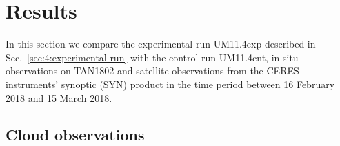 \begin{table}
\caption[Diagnostic model levels and layers]{
Diagnostic model levels and layers relevant to shallow boundary layer convection, turbulence
and cloud, listed from the lowest to the highest.
}
\label{tab:4:levels}
\centering
\centerline{}
\end{table}


\section{Results}
\label{sec:4:results}

In this section we compare the experimental run UM11.4exp described in Sec.~\ref{sec:4:experimental-run} with the control run UM11.4cnt, in-situ observations on TAN1802 and satellite observations from the CERES instruments' synoptic (SYN) product \citep{loeb2018} in the time period between 16 February 2018 and 15 March 2018.

\subsection{Cloud observations}

